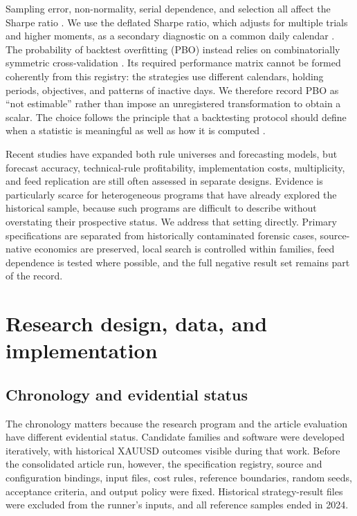 Sampling error, non-normality, serial dependence, and selection all affect the Sharpe ratio \citep{lo2002}. We use the deflated Sharpe ratio, which adjusts for multiple trials and higher moments, as a secondary diagnostic on a common daily calendar \citep{bailey2014}. The probability of backtest overfitting (PBO) instead relies on combinatorially symmetric cross-validation \citep{bailey2017}. Its required performance matrix cannot be formed coherently from this registry: the strategies use different calendars, holding periods, objectives, and patterns of inactive days. We therefore record PBO as ``not estimable'' rather than impose an unregistered transformation to obtain a scalar. The choice follows the principle that a backtesting protocol should define when a statistic is meaningful as well as how it is computed \citep{arnott2019}.

Recent studies have expanded both rule universes and forecasting models, but forecast accuracy, technical-rule profitability, implementation costs, multiplicity, and feed replication are still often assessed in separate designs. Evidence is particularly scarce for heterogeneous programs that have already explored the historical sample, because such programs are difficult to describe without overstating their prospective status. We address that setting directly. Primary specifications are separated from historically contaminated forensic cases, source-native economics are preserved, local search is controlled within families, feed dependence is tested where possible, and the full negative result set remains part of the record.

\section{Research design, data, and implementation}\label{sec:design}

\subsection{Chronology and evidential status}\label{subsec:chronology}

The chronology matters because the research program and the article evaluation have different evidential status. Candidate families and software were developed iteratively, with historical XAUUSD outcomes visible during that work. Before the consolidated article run, however, the specification registry, source and configuration bindings, input files, cost rules, reference boundaries, random seeds, acceptance criteria, and output policy were fixed. Historical strategy-result files were excluded from the runner's inputs, and all reference samples ended in 2024.


